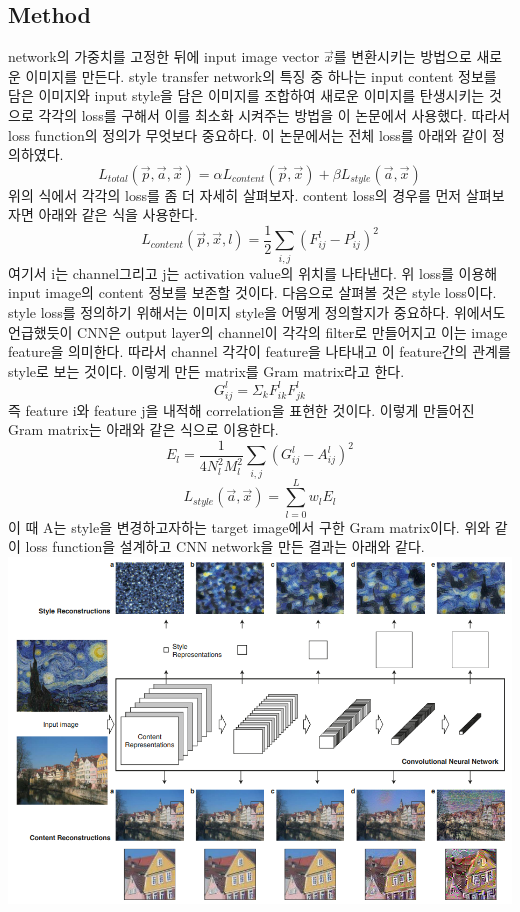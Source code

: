 \documentclass[extendedabs]{bmvc2k}
\begin{document}
 \subsection{Method}
 \quad  network의 가중치를 고정한 뒤에 input image vector $\vec{x}$를 변환시키는 방법으로 새로운 이미지를 만든다. style transfer network의 특징 중 하나는 
input content 정보를 담은 이미지와 input style을 담은 이미지를 조합하여 새로운 이미지를 탄생시키는 것으로 각각의 loss를 구해서 이를 최소화 시켜주는 방법을 이 논문에서 사용했다.
따라서 loss function의 정의가 무엇보다 중요하다. 이 논문에서는 전체 loss를 아래와 같이 정의하였다.
$$L_{total}(\vec{p},\vec{a},\vec{x}) = \alpha L_{content}(\vec{p}, \vec{x} ) + \beta L_{style}(\vec{a},\vec{x})$$
위의 식에서 각각의 loss를 좀 더 자세히 살펴보자. 
content loss의 경우를 먼저 살펴보자면 아래와 같은 식을 사용한다. 
$$L_{content}(\vec{p},\vec{x},l) = \frac{1}{2}\sum_{i,j}^{}(F^l_{ij}-P^l_{ij})^2$$
여기서 i는 channel그리고 j는 activation value의 위치를 나타낸다. 위 loss를 이용해 input image의 content 정보를 보존할 것이다.
다음으로 살펴볼 것은 style loss이다. style loss를 정의하기 위해서는 이미지 style을 어떻게 정의할지가 중요하다. 
위에서도 언급했듯이 CNN은 output layer의 channel이 각각의 filter로 만들어지고 이는 image feature을 의미한다.
따라서 channel 각각이 feature을 나타내고 이 feature간의 관계를 style로 보는 것이다. 이렇게 만든 matrix를 Gram matrix라고 한다.
$$ G_{ij}^l = \Sigma_k F_{ik}^l F _{jk}^l$$
즉 feature i와 feature j을 내적해 correlation을 표현한 것이다. 이렇게 만들어진 Gram matrix는 아래와 같은 식으로 이용한다.
$$E_l = \frac{1}{4N_l^2M_l^2}\sum_{i,j}^{}(G_{ij}^l-A_{ij}^l)^2$$
$$L_{style}(\vec{a},\vec{x}) = \sum_{l=0}^{L}w_lE_l$$
이 때 A는 style을 변경하고자하는 target image에서 구한 Gram matrix이다. 
위와 같이 loss function을 설계하고 CNN network을 만든 결과는 아래와 같다.
\newline  \includegraphics[width=\linewidth]{images/04_style.PNG}
\end{document}
